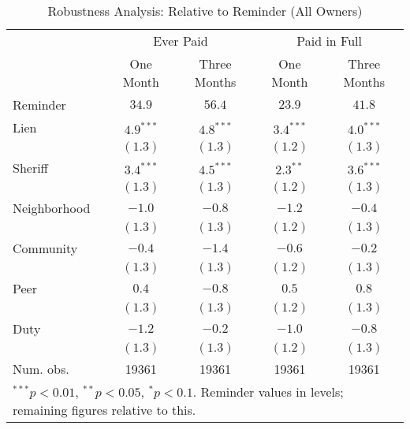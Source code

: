 \documentclass[12pt]{article}
\begin{document}
\begin{appendix}
\begin{table}[htbp]
\caption{Robustness Analysis: Relative to Reminder (All Owners)}
\begin{center}
\begin{tabular}{l c c c c }
\hline
 & \multicolumn{2}{c}{Ever Paid} & \multicolumn{2}{c}{Paid in Full} \\
 & One Month & Three Months & One Month & Three Months \\
Reminder     & $34.9$ & $56.4$ & $23.9$ & $41.8$ \\
\hline
Lien         & $4.9^{***}$  & $4.8^{***}$  & $3.4^{***}$  & $4.0^{***}$  \\
             & $(1.3)$      & $(1.3)$      & $(1.2)$      & $(1.3)$      \\
Sheriff      & $3.4^{***}$  & $4.5^{***}$  & $2.3^{**}$   & $3.6^{***}$  \\
             & $(1.3)$      & $(1.3)$      & $(1.2)$      & $(1.3)$      \\
Neighborhood & $-1.0$       & $-0.8$       & $-1.2$       & $-0.4$       \\
             & $(1.3)$      & $(1.3)$      & $(1.2)$      & $(1.3)$      \\
Community    & $-0.4$       & $-1.4$       & $-0.6$       & $-0.2$       \\
             & $(1.3)$      & $(1.3)$      & $(1.2)$      & $(1.3)$      \\
Peer         & $0.4$        & $-0.8$       & $0.5$        & $0.8$        \\
             & $(1.3)$      & $(1.3)$      & $(1.2)$      & $(1.3)$      \\
Duty         & $-1.2$       & $-0.2$       & $-1.0$       & $-0.8$       \\
             & $(1.3)$      & $(1.3)$      & $(1.2)$      & $(1.3)$      \\
\hline
Num. obs.    & 19361        & 19361        & 19361        & 19361        \\
\hline
\multicolumn{5}{l}{\scriptsize{$^{***}p<0.01$, $^{**}p<0.05$, $^*p<0.1$. Reminder values in levels; remaining figures relative to this.}}
\end{tabular}
\label{sh_lpm_mult}
\end{center}
\end{table}


\end{appendix}
\end{document}
